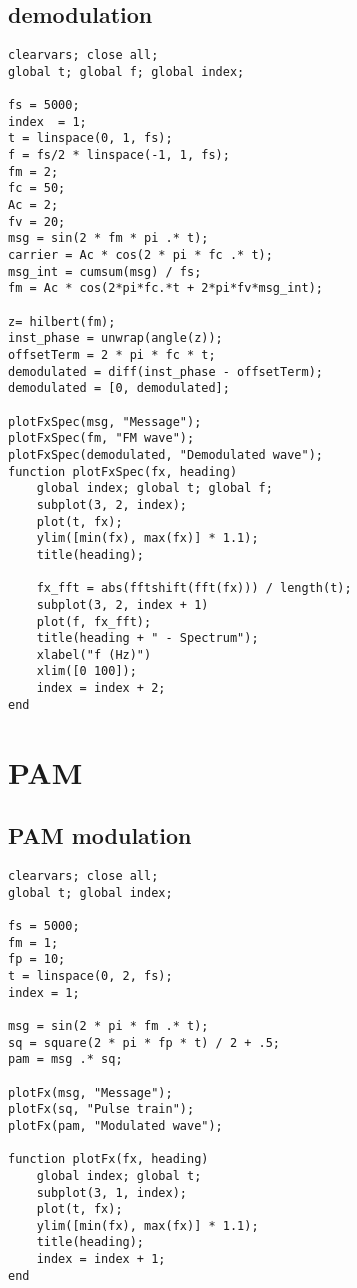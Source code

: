 \documentclass[12pt,a4paper]{article}
\newcommand{\sectiona}[1]{\pagebreak \section{\centering #1}}
\begin{document}
\subsection{demodulation}
\begin{verbatim}
clearvars; close all;
global t; global f; global index;

fs = 5000;
index  = 1;
t = linspace(0, 1, fs);
f = fs/2 * linspace(-1, 1, fs);
fm = 2;
fc = 50;
Ac = 2;
fv = 20;
msg = sin(2 * fm * pi .* t);
carrier = Ac * cos(2 * pi * fc .* t);
msg_int = cumsum(msg) / fs;
fm = Ac * cos(2*pi*fc.*t + 2*pi*fv*msg_int);

z= hilbert(fm);
inst_phase = unwrap(angle(z));
offsetTerm = 2 * pi * fc * t;
demodulated = diff(inst_phase - offsetTerm);
demodulated = [0, demodulated];

plotFxSpec(msg, "Message");
plotFxSpec(fm, "FM wave");
plotFxSpec(demodulated, "Demodulated wave");
function plotFxSpec(fx, heading)
    global index; global t; global f;
    subplot(3, 2, index);
    plot(t, fx);
    ylim([min(fx), max(fx)] * 1.1);
    title(heading);

    fx_fft = abs(fftshift(fft(fx))) / length(t);
    subplot(3, 2, index + 1)
    plot(f, fx_fft);
    title(heading + " - Spectrum");
    xlabel("f (Hz)")
    xlim([0 100]);
    index = index + 2;
end
\end{verbatim}
\sectiona{PAM}
\subsection{PAM modulation}
\begin{verbatim}
clearvars; close all;
global t; global index;

fs = 5000;
fm = 1;
fp = 10;
t = linspace(0, 2, fs);
index = 1;

msg = sin(2 * pi * fm .* t);
sq = square(2 * pi * fp * t) / 2 + .5;
pam = msg .* sq;

plotFx(msg, "Message");
plotFx(sq, "Pulse train");
plotFx(pam, "Modulated wave");

function plotFx(fx, heading)
    global index; global t;
    subplot(3, 1, index);
    plot(t, fx);
    ylim([min(fx), max(fx)] * 1.1);
    title(heading);
    index = index + 1;
end
\end{verbatim}
\end{document}
